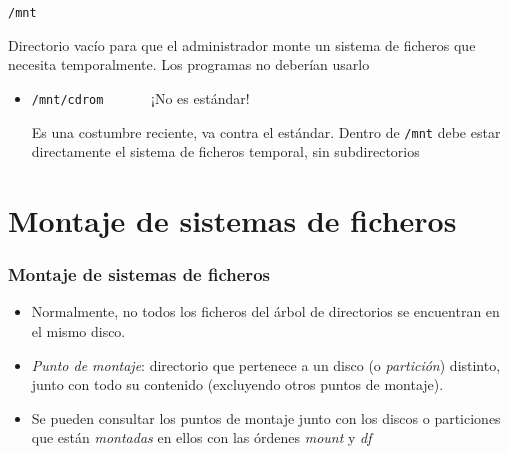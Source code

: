 \documentclass[ucs]{beamer}
\begin{document}
\begin{frame}[fragile]
\begin{verbatim}
/mnt
\end{verbatim}

Directorio vacío para que el administrador monte 
un sistema de ficheros que necesita temporalmente. Los programas no deberían usarlo

\begin{itemize}	
\item
\verb|/mnt/cdrom      |    ¡No es estándar!

Es una costumbre reciente, va contra el estándar. Dentro  de \verb|/mnt| 
debe estar directamente el sistema de ficheros temporal, sin subdirectorios
\end{itemize}



\end{frame}

  \section{Montaje de sistemas de ficheros }
\begin{frame}[fragile]
  \frametitle{Montaje de sistemas de ficheros }
  \begin{itemize}
  \item Normalmente, no todos los ficheros del árbol de directorios se
    encuentran en el mismo disco.
  \item \emph{Punto de montaje}: directorio que pertenece a un disco
    (o \emph{partición}) distinto, junto con todo su contenido
    (excluyendo otros puntos de montaje).
  \item Se pueden consultar los puntos de montaje junto con
    los discos o particiones que están \emph{montadas} en ellos con
    las órdenes \emph{mount} y \emph{df}
  \end{itemize}
\end{frame}

\end{document}
